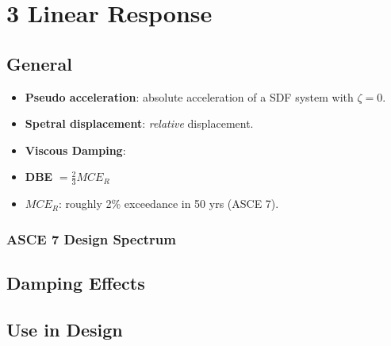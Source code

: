 \hypertarget{linear-response}{%
\section{3 Linear Response}\label{linear-response}}

\hypertarget{general}{%
\subsection{General}\label{general}}

\begin{itemize}
\tightlist
\item
  \textbf{Pseudo acceleration}: absolute acceleration of a SDF system
  with \(\zeta=0\).
\item
  \textbf{Spetral displacement}: \emph{relative} displacement.
\item
  \textbf{Viscous Damping}:
\item
  \textbf{DBE} \(= \frac{2}{3}MCE_R\)
\item
  \(MCE_R\): roughly 2\% exceedance in 50 yrs (ASCE 7).
\end{itemize}

\hypertarget{asce-7-design-spectrum}{%
\subsubsection{ASCE 7 Design Spectrum}\label{asce-7-design-spectrum}}

\hypertarget{damping-effects}{%
\subsection{Damping Effects}\label{damping-effects}}

\hypertarget{use-in-design}{%
\subsection{Use in Design}\label{use-in-design}}
